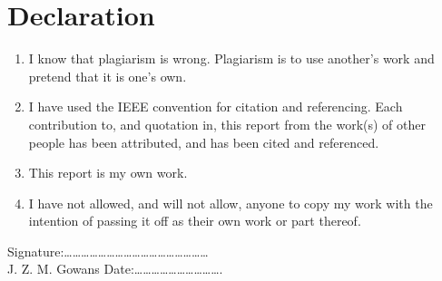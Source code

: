 
\chapter{Declaration}
\begin{enumerate}
\item I know that plagiarism is wrong. Plagiarism is to use another's work and pretend that it is one's
own.
\item I have used the IEEE convention for citation and referencing. Each contribution to, and quotation in,
this report from the work(s) of other people has been attributed, and has been cited and
referenced.
\item This report is my own work.
\item I have not allowed, and will not allow, anyone to copy my work with the intention of passing it off
as their own work or part thereof.
\end{enumerate}
\vskip 20mm
Signature:\ldots\ldots\ldots\ldots\ldots\ldots\ldots\ldots\ldots\ldots\ldots\ldots\ldots\ldots\ldots\ldots\ldots
\\J. Z. M. Gowans		%
\vskip 20mm
Date:\ldots\ldots\ldots\ldots\ldots\ldots\ldots\ldots\ldots\ldots .

